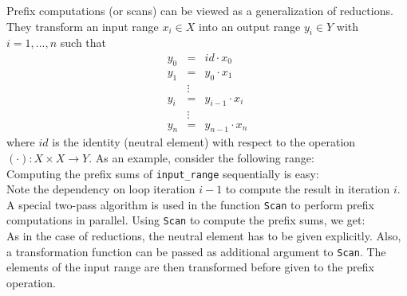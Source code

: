 Prefix computations (or scans) can be viewed as a generalization of reductions. They transform an input range $x_i \in X$ into an output range $y_i \in Y$ with $i=1,...,n$ such that
\begin{eqnarray*}
y_0 &=& id \cdot x_0 \\
y_1 &=& y_0 \cdot x_1 \\
&\vdots& \\
y_i &=& y_{i-1} \cdot x_i \\
&\vdots& \\
y_n &=& y_{n-1} \cdot x_n
\end{eqnarray*}
where $id$ is the identity (neutral element) with respect to the operation $(\cdot): X \times X \rightarrow Y$. As an example, consider the following range:
%
\\
%
Computing the prefix sums of \lstinline|input_range| sequentially is easy:
%
\\
%
Note the dependency on loop iteration $i-1$ to compute the result in iteration $i$. A special two-pass algorithm is used in the {\embb} function \lstinline|Scan| to perform prefix computations in parallel. Using \lstinline|Scan| to compute the prefix sums, we get:
%
\\
%
As in the case of reductions, the neutral element has to be given explicitly. Also, a transformation function can be passed as additional argument to \lstinline|Scan|. The elements of the input range are then transformed before given to the prefix operation.